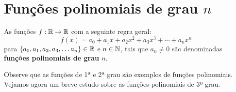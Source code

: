 







\section{Funções polinomiais de grau \texorpdfstring{$n$}{n}}

\begin{obs}
As funções $f: \mathbb{R} \to \mathbb{R}$ com a seguinte regra geral:
\begin{equation*}
f(x) = a_0 + a_1 x + a_2 x^2 + a_3 x^3 + \cdots + a_n x^n
\end{equation*}
para $\{a_0, a_1, a_2, a_3, \ldots a_n\} \in \mathbb{R}$ e $n \in \mathbb{N}$, tais que $a_n \neq 0$ são denominadas \\ \textbf{funções polinomiais de grau $n$}.
\end{obs}

Observe que as funções de 1ª e 2ª grau são exemplos de funções polinomiais. Vejamos agora um breve estudo sobre as funções polinomiais de 3º grau.

